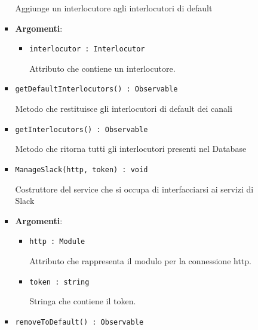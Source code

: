 \documentclass[../DefinizioneDiProdotto.tex]{subfiles}
\begin{document}
\begin{itemize}
\begin{itemize}
\begin{itemize}
	 Aggiunge un interlocutore agli interlocutori di default

	\item \textbf{Argomenti}:
	\begin{itemize}
	\item \texttt{interlocutor : Interlocutor}\

	 Attributo che contiene un interlocutore.
	\end{itemize}
	\end{itemize}\vspace{0.5em}
	\begin{itemize}
	\item \texttt{getDefaultInterlocutors() : Observable}\

	 Metodo che restituisce gli interlocutori di default dei canali
	\end{itemize}\vspace{0.5em}
	\begin{itemize}
	\item \texttt{getInterlocutors() : Observable}\

	 Metodo che ritorna tutti gli interlocutori presenti nel Database
	\end{itemize}\vspace{0.5em}
	\begin{itemize}
	\item \texttt{ManageSlack(http, token) : void}\

	 Costruttore del service che si occupa di interfacciarsi ai servizi di Slack

	\item \textbf{Argomenti}:
	\begin{itemize}
	\item \texttt{http : Module}\

	 Attributo che rappresenta il modulo per la connessione http.
	\item \texttt{token : string}\

	 Stringa che contiene il token.
	\end{itemize}
	\end{itemize}\vspace{0.5em}
	\begin{itemize}
	\item \texttt{removeToDefault() : Observable}\


\end{itemize}
\end{itemize}
\end{itemize}
\end{document}
